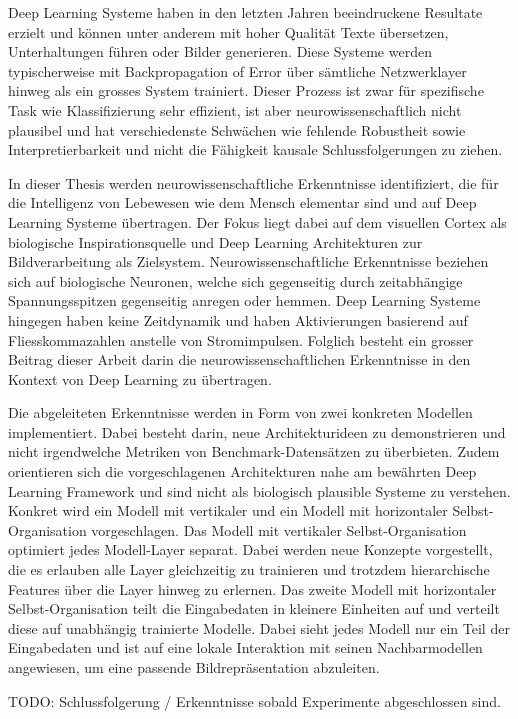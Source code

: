 Deep Learning Systeme haben in den letzten Jahren beeindruckene Resultate erzielt und können unter anderem mit hoher Qualität Texte übersetzen, Unterhaltungen führen oder Bilder generieren. Diese Systeme werden typischerweise mit Backpropagation of Error über sämtliche Netzwerklayer hinweg als ein grosses System trainiert. Dieser Prozess ist zwar für spezifische Task wie Klassifizierung sehr effizient, ist aber neurowissenschaftlich nicht plausibel und hat verschiedenste Schwächen wie fehlende Robustheit sowie Interpretierbarkeit und nicht die Fähigkeit kausale Schlussfolgerungen zu ziehen.

In dieser Thesis werden neurowissenschaftliche Erkenntnisse identifiziert, die für die Intelligenz von Lebewesen wie dem Mensch elementar sind und auf Deep Learning Systeme übertragen. Der Fokus liegt dabei auf dem visuellen Cortex als biologische Inspirationsquelle und Deep Learning Architekturen zur Bildverarbeitung als Zielsystem. Neurowissenschaftliche Erkenntnisse beziehen sich auf biologische Neuronen, welche sich gegenseitig durch zeitabhängige Spannungsspitzen gegenseitig anregen oder hemmen. Deep Learning Systeme hingegen haben keine Zeitdynamik und haben Aktivierungen basierend auf Fliesskommazahlen anstelle von Stromimpulsen. Folglich besteht ein grosser Beitrag dieser Arbeit darin die neurowissenschaftlichen Erkenntnisse in den Kontext von Deep Learning zu übertragen.

Die abgeleiteten Erkenntnisse werden in Form von zwei konkreten Modellen implementiert. Dabei besteht darin, neue Architekturideen zu demonstrieren und nicht irgendwelche Metriken von Benchmark-Datensätzen zu überbieten. Zudem orientieren sich die vorgeschlagenen Architekturen nahe am bewährten Deep Learning Framework und sind nicht als biologisch plausible Systeme zu verstehen. Konkret wird ein Modell mit vertikaler und ein Modell mit horizontaler Selbst-Organisation vorgeschlagen. Das Modell mit vertikaler Selbst-Organisation optimiert jedes Modell-Layer separat. Dabei werden neue Konzepte vorgestellt, die es erlauben alle Layer gleichzeitig zu trainieren und trotzdem hierarchische Features über die Layer hinweg zu erlernen. Das zweite Modell mit horizontaler Selbst-Organisation teilt die Eingabedaten in kleinere Einheiten auf und verteilt diese auf unabhängig trainierte Modelle. Dabei sieht jedes Modell nur ein Teil der Eingabedaten und ist auf eine lokale Interaktion mit seinen Nachbarmodellen angewiesen, um eine passende Bildrepräsentation abzuleiten.

TODO: Schlussfolgerung / Erkenntnisse sobald Experimente abgeschlossen sind.
